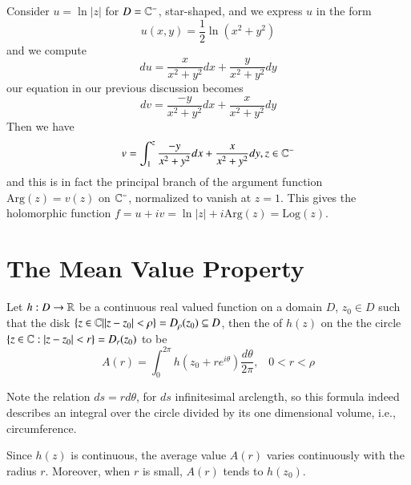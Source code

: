 \begin{example}
    Consider $u = \ln|z|$ for $D = \mathbb C^-$, star-shaped, and we express $u$ in the form \begin{equation*}
        u(x,y) = \frac{1}{2}\ln(x^2+y^2)
    \end{equation*}
    and we compute \begin{equation*}
        du = \frac{x}{x^2+y^2}dx + \frac{y}{x^2+y^2}dy
    \end{equation*}
    our equation in our previous discussion becomes \begin{equation*}
        dv = \frac{-y}{x^2+y^2}dx + \frac{x}{x^2+y^2}dy
    \end{equation*}
    Then we have \begin{equation*}
        v = \int_1^z\frac{-y}{x^2+y^2}dx + \frac{x}{x^2+y^2}dy, z \in \mathbb C^-
    \end{equation*}
    and this is in fact the principal branch of the argument function $\text{Arg}(z) = v(z)$ on $\mathbb C^-$, normalized to vanish at $z = 1$. This gives the holomorphic function $f = u+iv = \ln|z|+i\text{Arg}(z)=\text{Log}(z)$.
\end{example}


\section{The Mean Value Property}

\begin{definition}
    Let $h:D\rightarrow \mathbb R$ be a continuous real valued function on a domain $D$, $z_0 \in D$ such that the disk $\{z \in \mathbb C\vert |z-z_0| < \rho\} = D_{\rho}(z_0)\subseteq D$, then the  of $h(z)$ on the the circle $\{z \in \mathbb C:|z-z_0| < r\} = D_r(z_0)$ to be \begin{equation*}
        A(r) = \int_0^{2\pi}h(z_0+re^{i\theta})\frac{d\theta}{2\pi}, \;\;\; 0 < r < \rho 
    \end{equation*}
\end{definition}
Note the relation $ds = rd\theta$, for $ds$ infinitesimal arclength, so this formula indeed describes an integral over the circle divided by its one dimensional volume, i.e., circumference.

Since $h(z)$ is continuous, the average value $A(r)$ varies continuously with the radius $r$. Moreover, when $r$ is small, $A(r)$ tends to $h(z_0)$.

